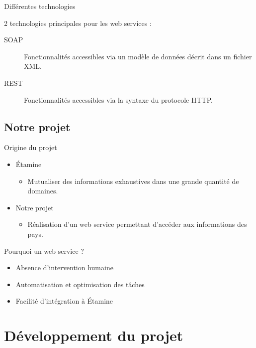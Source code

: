 \documentclass{beamer}
\begin{document}
\begin{frame}{Différentes technologies}

   2 technologies principales pour les web services :
  \begin{description}
    \item[SOAP] Fonctionnalités accessibles via un modèle de données décrit dans un fichier XML.
      \pause
    \item[REST] Fonctionnalités accessibles via la syntaxe du protocole HTTP.
  \end{description}
\end{frame}


\subsection{Notre projet}

\begin{frame}{Origine du projet}
\begin{itemize}
  \item
     Étamine
	\begin{itemize}
   	\item
      	Mutualiser des informations exhaustives dans une grande quantité de domaines.
	\end{itemize}
   \pause
   \item
      Notre projet
	\begin{itemize}
	\item
   	  Réalisation d'un web service permettant d'accéder aux informations des pays.
	\end{itemize}
\end{itemize}
\end{frame}

\begin{frame}{Pourquoi un web service ?}

\begin{itemize}
\item 
  Absence d'intervention humaine
  \pause
\item
  Automatisation et optimisation des tâches
  \pause
\item 
  Facilité d'intégration à Étamine
\end{itemize}

\end{frame}

\section{Développement du projet}
\end{document}
